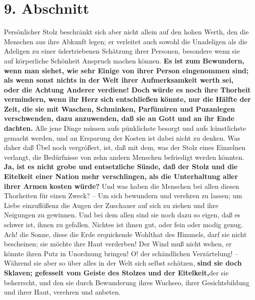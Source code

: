 \section{9. Abschnitt} \label{kap11_ab9}

Persönlicher Stolz beschränkt sich aber nicht allein auf den hohen Werth, den
die Menschen aus ihre Abkunft legen; er verleitet auch sowohl die Unadeligen als
die Adeligen zu einer üdertriebenen Schätzung ihrer Personen, besondere wenn sie
auf körperliche Schönheit Anspruch machen können. \label{ref:11_09_putzsucht}
\textbf{Es ist zum Bewundern, wenn man
siehet, wie sehr Einige von ihrer Person eingenommen sind; als wenn sonst nichts
in der Welt ihrer Aufmerksamkeit werth sei, oder die Achtung Anderer verdiene!
Doch würde es noch ihre Thorheit vermindern, wenn ihr Herz sich entschließen
könnte, nur die Hälfte der Zeit, die sie mit Waschen,
Schminken, Parfümiren und
Puzanlegen verschwenden, dazu anzuwenden, daß sie an Gott und an ihr Ende
dachten.} Alle jene Dinge müssen aufs pünklichste besorgt und aufs künstlichste
gemacht werden, und an Ersparung der Kosten ist dabei nicht zu denken. Was daher
daß Übel noch vergrößert, ist, daß mit dem, was der Stolz eines Einzelnen
verlangt, die Bedürfnisse von zehn andern Menschen befriedigt werden könnten.
\textbf{Ja, ist es nicht grobe und entsetzliche Sünde, daß der
Stolz und die Eitelkeit
einer Nation mehr verschlingen, als die Unterhaltung aller ihrer Armen kosten
würde?} Und was haben die Menschen bei allen diesen Thorheiten für einen Zweck?
-- Um sich bewundern und verehren zu lassen; um Liebe einzuflößenz die Augen der
Zuschauer auf sich zu ziehen und ihre Neigungen zu gewinnen. Und bei dem allen
sind sie noch dazu so eigen, daß es schwer ist, ihnen zu gefallen. Nichtes ist
ihnen gut, oder fein oder modig genug. Ach! die Sonne, diese
die Erde
erquickende Wohlthat des Himmels, darf sie nicht bescheinen; sie möchte ihre
Haut verderben! Der Wind muß nicht wehen, er könnte ihren Putz in Unordnung
bringen! O! der schändlichen Verzärtelung! -- Während sie aber so über alles in
der Welt sich selbst schätzen, \textbf{sind sie doch Sklaven;
gefesselt vom Geiste des
Stolzes und der Eitelkeit,}der sie beherrscht, und den sie durch Bewunderung
ihres Wuchseo, ihrer Gesichtsbildung und ihrer Haut, verehren und anbeten.

